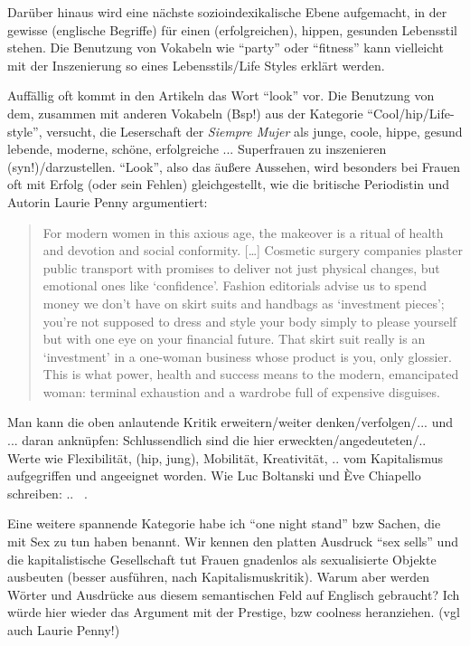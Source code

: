 Darüber hinaus wird eine nächste sozioindexikalische Ebene aufgemacht, in der gewisse (englische Begriffe) für einen (erfolgreichen), hippen, gesunden Lebensstil stehen. %
Die Benutzung von Vokabeln wie ``party'' oder ``fitness'' kann vielleicht mit der Inszenierung so eines Lebensstils/Life Styles erklärt werden.


Auffällig oft kommt in den Artikeln das Wort ``look'' vor.
Die Benutzung von dem, zusammen mit anderen Vokabeln (Bsp!) aus der Kategorie ``Cool/hip/Life-style'', versucht, die Leserschaft der \textit{Siempre Mujer} als junge, coole, hippe, gesund lebende, moderne, schöne, erfolgreiche ... Superfrauen zu inszenieren (syn!)/darzustellen.
``Look'', also das äußere Aussehen, wird besonders bei Frauen oft mit Erfolg (oder sein Fehlen) gleichgestellt, wie die britische Periodistin und Autorin Laurie Penny argumentiert:

\begin{quote}
For modern women in this axious age, the makeover is a ritual of health and devotion and social conformity.
[\ldots]
Cosmetic surgery companies plaster public transport with promises to deliver not just physical changes, but emotional ones like `confidence'.
Fashion editorials advise us to spend money we don't have on skirt suits and handbags as `investment pieces'; you're not supposed to dress and style your body simply to please yourself but with one eye on your financial future.
That skirt suit really is an `investment' in a one-woman business whose product is you, only glossier.
This is what power, health and success means to the modern, emancipated woman: terminal exhaustion and a wardrobe full of expensive disguises.~\cite[p.41-42]{Penny14}
\end{quote}



Man kann die oben anlautende Kritik erweitern/weiter denken/verfolgen/... und ... daran anknüpfen:
Schlussendlich sind die hier erweckten/angedeuteten/.. Werte wie Flexibilität, (hip, jung), Mobilität, Kreativität, .. vom Kapitalismus aufgegriffen und angeeignet worden.
Wie Luc Boltanski und Ève Chiapello schreiben: .. ~\cite[]{BolChi07}.

Eine weitere spannende Kategorie habe ich ``one night stand'' bzw Sachen, die mit Sex zu tun haben benannt.
Wir kennen den platten Ausdruck ``sex sells'' und die kapitalistische Gesellschaft tut Frauen gnadenlos als sexualisierte Objekte ausbeuten (besser ausführen, nach Kapitalismuskritik).
Warum aber werden Wörter und Ausdrücke aus diesem semantischen Feld auf Englisch gebraucht?
Ich würde hier wieder das Argument mit der Prestige, bzw coolness heranziehen. (vgl auch Laurie Penny!)

